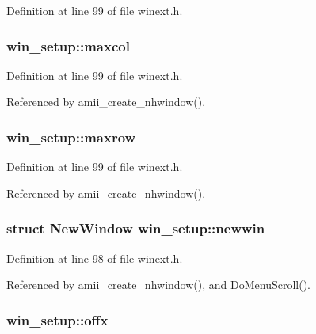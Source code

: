 Definition at line 99 of file winext.\+h.

\hypertarget{structwin__setup_a672999163c8dad3dd4e1a68bc8ec2604}{
\subsubsection[{maxcol}]{ win\+\_\+setup\+::maxcol}}\label{structwin__setup_a672999163c8dad3dd4e1a68bc8ec2604}


Definition at line 99 of file winext.\+h.



Referenced by amii\+\_\+create\+\_\+nhwindow().

\hypertarget{structwin__setup_aa8dc4df6c1d1b3ba409d0b81d3bb3f94}{
\subsubsection[{maxrow}]{ win\+\_\+setup\+::maxrow}}\label{structwin__setup_aa8dc4df6c1d1b3ba409d0b81d3bb3f94}


Definition at line 99 of file winext.\+h.



Referenced by amii\+\_\+create\+\_\+nhwindow().

\hypertarget{structwin__setup_a274eccbc444f827a7db33a83c4f4ec70}{
\subsubsection[{newwin}]{\setlength{\rightskip}{0pt plus 5cm}struct New\+Window win\+\_\+setup\+::newwin}}\label{structwin__setup_a274eccbc444f827a7db33a83c4f4ec70}


Definition at line 98 of file winext.\+h.



Referenced by amii\+\_\+create\+\_\+nhwindow(), and Do\+Menu\+Scroll().

\hypertarget{structwin__setup_a69b3eb368183c34f4654d7d27ed28612}{
\subsubsection[{offx}]{ win\+\_\+setup\+::offx}}\label{structwin__setup_a69b3eb368183c34f4654d7d27ed28612}


